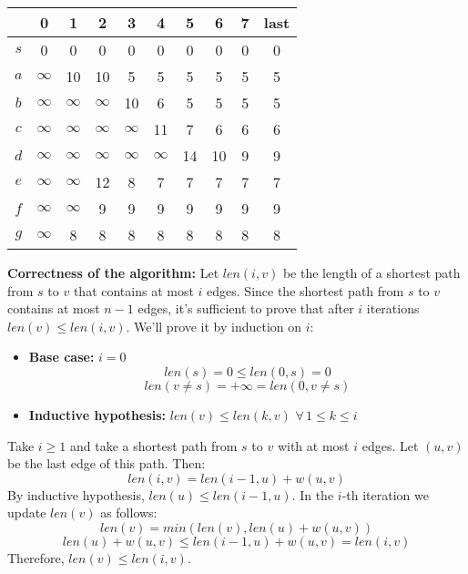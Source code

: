 \begin{center}
    \begin{tabular}{c| c c c c c c c c|c}
        & 0 & 1 & 2 & 3 & 4 & 5 & 6 & 7 & last\\
        \hline\hline
         $s$ & 0 & 0 & 0 & 0 & 0 & 0 & 0 & 0 & 0 \\
         $a$ & $\infty$ & 10 & 10 & 5 & 5 & 5 & 5 & 5 & 5\\
         $b$ & $\infty$ & $\infty$ & $\infty$ & 10 & 6 & 5 & 5 & 5 & 5\\
         $c$ & $\infty$ & $\infty$ & $\infty$ & $\infty$ & 11 & 7 & 6 & 6 & 6\\
         $d$ & $\infty$ & $\infty$ & $\infty$ & $\infty$ & $\infty$ & 14 & 10 & 9 & 9\\
         $e$ & $\infty$ & $\infty$ & 12 & 8 & 7 & 7 & 7 & 7 & 7\\
         $f$ & $\infty$ & $\infty$ & 9 & 9 & 9 & 9 & 9 & 9 & 9\\
         $g$ & $\infty$ & 8 & 8 & 8 & 8 & 8 & 8 & 8 & 8\\
\end{tabular}
\end{center}
\textbf{Correctness of the algorithm:}\newline\newline
Let $len(i, v)$ be the length of a shortest path from $s$ to $v$ that contains at most $i$ edges. Since the shortest path from $s$ to $v$ contains at most $n - 1$ edges, it's sufficient to prove that after $i$ iterations $len(v) \leq len(i, v)$.\newline\newline
We'll prove it by induction on $i$:
\begin{itemize}
    \item \textbf{Base case:} $i = 0$
    \[len(s) = 0 \leq len(0, s) = 0\]
    \[len(v \neq s) = +\infty = len(0, v \neq s)\]

    \item \textbf{Inductive hypothesis:} $len(v) \leq len(k, v) \,\, \forall \, 1 \leq k \leq i$
\end{itemize}
Take $i \geq 1$ and take a shortest path from $s$ to $v$ with at most $i$ edges. Let $(u, v)$ be the last edge of this path. Then:
\[len(i, v) = len(i - 1, u) + w(u, v)\]
By inductive hypothesis, $len(u) \leq len(i - 1, u)$. In the $i$-th iteration we update $len(v)$ as follows:
\[len(v) = min(len(v), len(u) + w(u, v))\]
\[len(u) + w(u, v) \leq len(i - 1, u) + w(u, v) = len(i, v)\]
Therefore, $len(v) \leq len(i, v)$.

